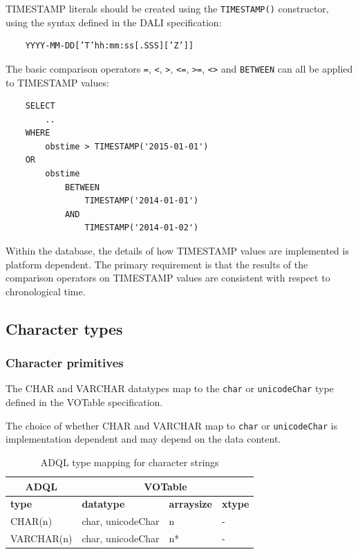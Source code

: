 \documentclass[11pt,a4paper]{ivoa}
\newcommand{\VOTspec}{VOTable specification\xspace}
\newcommand{\DALIspec}{DALI specification\xspace}
\begin{document}
TIMESTAMP literals should be created using the \verb:TIMESTAMP():
constructor, using the syntax defined in the \DALIspec:
\begin{verbatim}
    YYYY-MM-DD[’T’hh:mm:ss[.SSS][’Z’]]
\end{verbatim}

The basic comparison operators \verb:=:, \verb:<:, \verb:>:, \verb:<=:, \verb:>=:,
\verb:<>: and \verb:BETWEEN: can all be applied to TIMESTAMP values:
\begin{verbatim}
    SELECT
        ..
    WHERE
        obstime > TIMESTAMP('2015-01-01')
    OR
        obstime
            BETWEEN
                TIMESTAMP('2014-01-01')
            AND
                TIMESTAMP('2014-01-02')
\end{verbatim}

Within the database, the details of how TIMESTAMP values are implemented
is platform dependent. The primary requirement is that the results of the
comparison operators on TIMESTAMP values are consistent with respect to
chronological time.

\subsection{Character types}
\label{sec:types.character}

\subsubsection{Character primitives}
\label{sec:types.character.primitive}

The CHAR and VARCHAR datatypes map to the \verb:char: or
\verb:unicodeChar: type defined in the \VOTspec.

The choice of whether CHAR and VARCHAR map to \verb:char: or
\verb:unicodeChar: is implementation dependent and may depend
on the data content.

\begin{table}[thm]\footnotesize
    \begin{tabular}
        {|p{}|p{}|p{}|p{}|}
        \hline

        \hline
        \multicolumn{1}{|c|}{\textbf{ADQL}} &
        \multicolumn{3}{|c|}{\textbf{VOTable}}
        \tabularnewline
        
        \hline
        \textbf{type} &
        \textbf{datatype} &
        \textbf{arraysize} &
        \textbf{xtype}
        \tabularnewline

        \hline
        CHAR(n) &
        char, unicodeChar &
        n &
        -
        \tabularnewline

        \hline
        VARCHAR(n) &
        char, unicodeChar &
        n* &
        -
        \tabularnewline

        \hline
    \end{tabular}
    \caption{ADQL type mapping for character strings}
    \label{table:types.character.primitive}
\end{table}
\end{document}
